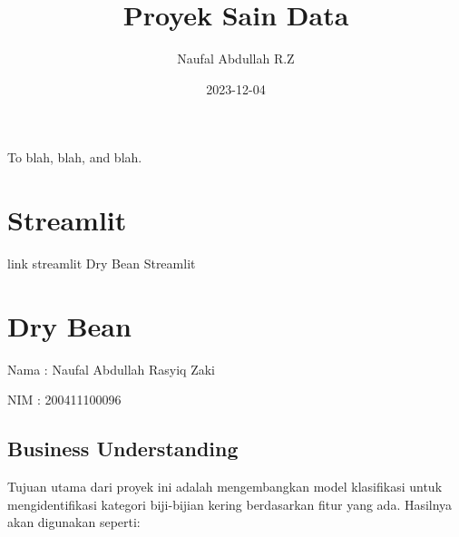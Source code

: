 \documentclass[
  letterpaper,
]{krantz}
\title{Proyek Sain Data}
\author{Naufal Abdullah R.Z}
\date{2023-12-04}
\renewcommand*\contentsname{Table of contents}
\newcommand\contentsname{Table of contents}
\begin{document}
\maketitle

\thispagestyle{empty}

\begin{center}
To blah, blah, and blah.
\end{center}

\setlength{\abovedisplayskip}{-5pt}
\setlength{\abovedisplayshortskip}{-5pt}

\ifdefined\Shaded\renewenvironment{Shaded}{\begin{tcolorbox}[frame hidden, interior hidden, sharp corners, enhanced, boxrule=0pt, borderline west={3pt}{0pt}{shadecolor}, breakable]}{\end{tcolorbox}}\fi

\renewcommand*\contentsname{Table of contents}
{
\hypersetup{linkcolor=}
\setcounter{tocdepth}{2}
\tableofcontents
}

\hypertarget{streamlit}{%
\chapter*{Streamlit}\label{streamlit}}


link streamlit Dry Bean Streamlit

\mainmatter


\hypertarget{dry-bean}{%
\chapter{Dry Bean}\label{dry-bean}}

Nama : Naufal Abdullah Rasyiq Zaki

NIM : 200411100096

\hypertarget{business-understanding}{%
\section{Business Understanding}\label{business-understanding}}

Tujuan utama dari proyek ini adalah mengembangkan model klasifikasi
untuk mengidentifikasi kategori biji-bijian kering berdasarkan fitur
yang ada. Hasilnya akan digunakan seperti:
\end{document}
